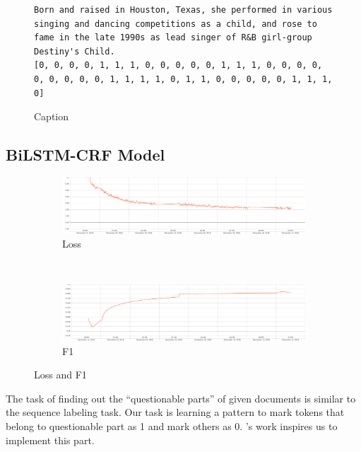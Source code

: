 \begin{figure}[h]
    \centering
    \begin{lstlisting}
Born and raised in Houston, Texas, she performed in various singing and dancing competitions as a child, and rose to fame in the late 1990s as lead singer of R&B girl-group Destiny's Child.
[0, 0, 0, 0, 1, 1, 1, 0, 0, 0, 0, 0, 1, 1, 1, 0, 0, 0, 0, 0, 0, 0, 0, 0, 1, 1, 1, 1, 0, 1, 1, 0, 0, 0, 0, 0, 1, 1, 1, 0]
    \end{lstlisting}
    \caption{Caption}
    \label{fig:questionable-span}
\end{figure}

\subsection{BiLSTM-CRF Model} \label{subsec:bilstm}

\begin{figure}[h]
  \centering
  \begin{subfigure}{\textwidth}\centering
    \includegraphics[width=\textwidth]{loss.pdf}
    \caption{Loss}
  \end{subfigure}\\
  \begin{subfigure}{\textwidth}\centering
    \includegraphics[width=\textwidth]{f1.pdf}
    \caption{F1}
  \end{subfigure}
  \caption{Loss and F1}
\end{figure}

The task of finding out the ``questionable parts'' of given documents is similar to the sequence labeling task. Our task is learning a pattern to mark tokens that belong to questionable part as 1 and mark others as 0. \citeauthor{huang2015bidirectional}'s work \cite{huang2015bidirectional} inspires us to implement this part.

